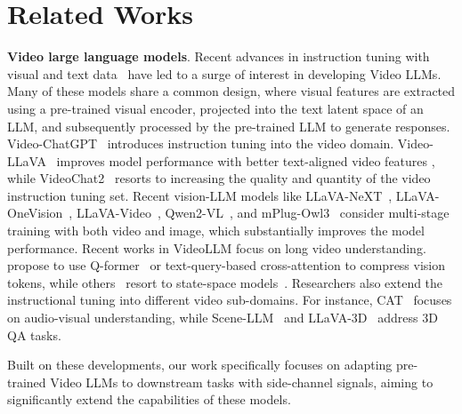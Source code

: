 \section{Related Works}
\label{sec:related_works}

\noindent \textbf{Video large language models}.
Recent advances in instruction tuning with visual and text data~\cite{liu2023visualinstructiontuning, liu2023improvedllava, liu2024llavanext} have led to a surge of interest in developing Video LLMs. Many of these models share a common design, where visual features are extracted using a pre-trained visual encoder, projected into the text latent space of an LLM, and subsequently processed by the pre-trained LLM to generate responses. 
%
Video-ChatGPT~\cite{maaz2024videochatgptdetailedvideounderstanding} introduces instruction tuning into the video domain. Video-LLaVA~\cite{lin2023video} improves model performance with better text-aligned video features \cite{zhu2023languagebind}, while VideoChat2~\cite{li2023mvbench} resorts to increasing the quality and quantity of the video instruction tuning set. Recent vision-LLM models like LLaVA-NeXT~\cite{liu2024llavanext}, LLaVA-OneVision~\cite{li2024llava}, LLaVA-Video~\cite{zhang2024videoinstructiontuningsynthetic}, Qwen2-VL~\cite{Qwen2VL}, and mPlug-Owl3~\cite{ye2024mplugowl3longimagesequenceunderstanding} consider multi-stage training with both video and image, which substantially improves the model performance.
Recent works in VideoLLM focus on long video understanding. ~\cite{wang2024videollamblongcontextvideounderstanding, faure2024hermestemporalcoherentlongformunderstanding, weng2024longvlmefficientlongvideo, korbar2024textconditionedresamplerlongform, zhang2024longcontexttransferlanguage, shen2024longvu} propose to use Q-former~\cite{li2023blip2bootstrappinglanguageimagepretraining} or text-query-based cross-attention to compress vision tokens, while others~\cite{nguyen2024encodingcontrollingglobalsemantics, wang2024longllavascalingmultimodalllms} resort to state-space models~\cite{gu2024mambalineartimesequencemodeling}.
Researchers also extend the instructional tuning into different video sub-domains. For instance, CAT~\cite{ye2024catenhancingmultimodallarge} focuses on audio-visual understanding, while Scene-LLM~\cite{fu2024scenellmextendinglanguagemodel} and LLaVA-3D~\cite{zhu2024llava3dsimpleeffectivepathway} address 3D QA tasks.

Built on these developments, our work specifically focuses on adapting pre-trained Video LLMs to downstream tasks with side-channel signals, aiming to significantly extend the capabilities of these models. 

